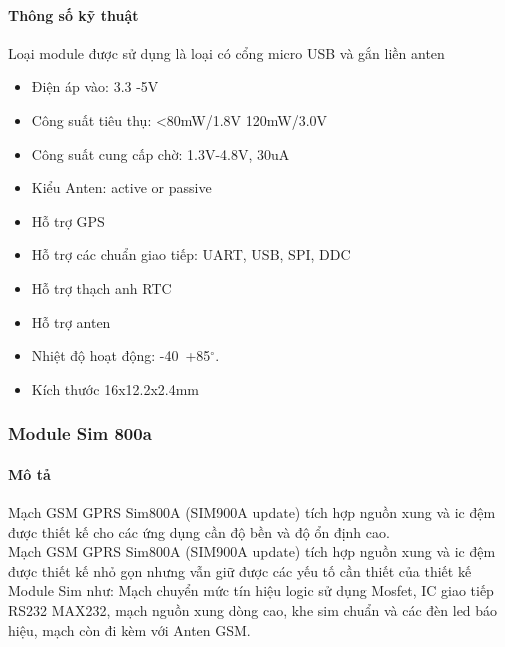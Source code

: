 \paragraph{Thông số kỹ thuật}
Loại module được sử dụng là loại có cổng micro USB và gắn liền anten
\begin{itemize}
\item Điện áp vào: 3.3 -5V
\item Công suất tiêu thụ: <80mW/1.8V 120mW/3.0V
\item Công suất cung cấp chờ: 1.3V-4.8V, 30uA
\item Kiểu Anten: active or passive
\item Hỗ trợ GPS
\item Hỗ trợ các chuẩn giao tiếp: UART, USB, SPI, DDC
\item Hỗ trợ thạch anh RTC
\item Hỗ trợ anten
\item Nhiệt độ hoạt động: -40~+85$^\circ$.
\item Kích thước 16x12.2x2.4mm
\end{itemize}

\subsubsection{Module Sim 800a}
\label{ref{fig3_5}}
\label{ref{fig3_6}}
\paragraph{Mô tả}
Mạch GSM GPRS Sim800A (SIM900A update) tích hợp nguồn xung và ic đệm được thiết kế cho các ứng dụng cần độ bền và độ ổn định cao.\\
Mạch GSM GPRS Sim800A (SIM900A update) tích hợp nguồn xung và ic đệm được thiết kế nhỏ gọn nhưng vẫn giữ được các yếu tố cần thiết của thiết kế Module Sim như: Mạch chuyển mức tín hiệu logic sử dụng Mosfet, IC giao tiếp RS232 MAX232, mạch nguồn xung dòng cao, khe sim chuẩn và các đèn led báo hiệu, mạch còn đi kèm với Anten GSM.
